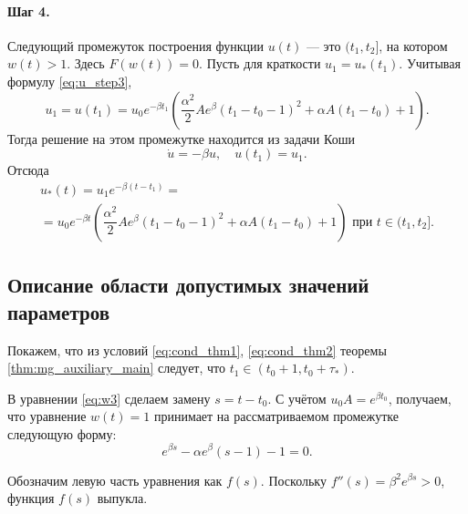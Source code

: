 \paragraph{Шаг 4.} Следующий промежуток построения функции $u(t)$ --- это $(t_1, t_2]$, на котором $w(t) > 1$. Здесь $F(w(t)) = 0$. Пусть для краткости $u_1 = u_*(t_1)$. Учитывая формулу \eqref{eq:u_step3},
\begin{equation*}
	u_1 = u(t_1) = u_0 e^{-\beta t_1}\left(\dfrac{\alpha^2}{2}Ae^{\beta}(t_1 - t_0 - 1)^2+\alpha A(t_1 - t_0)+1\right).
\end{equation*}
Тогда решение на этом промежутке находится из задачи Коши
\begin{equation*}
	\dot{u}=-\beta u,\quad u(t_1)=u_1.
\end{equation*}
Отсюда 
\begin{multline}
	\label{eq:u_step4}
	u_*(t)= u_1 e^{-\beta(t - t_1)} =\\= u_0 e^{-\beta t}\left(\dfrac{\alpha^2}{2}Ae^{\beta}(t_1 - t_0 - 1)^2 + \alpha A(t_1 - t_0) + 1\right) \text{ при } t \in (t_1,t_2].
\end{multline}

\subsection{Описание области допустимых значений параметров}

Покажем, что из условий \eqref{eq:cond_thm1}, \eqref{eq:cond_thm2} теоремы \ref{thm:mg_auxiliary_main} следует, что $t_1 \in (t_0+1,t_0+\tau_*)$.

В уравнении \eqref{eq:w3} сделаем замену $s = t - t_0$. С учётом $u_0A=e^{\beta t_0}$, получаем, что уравнение $w(t)=1$ принимает на рассматриваемом промежутке следующую форму:
\begin{equation}
	\label{eq:f}
	e^{\beta s} - \alpha e^{\beta}(s-1) - 1 = 0.
\end{equation}

Обозначим левую часть уравнения как $f(s)$. Поскольку $f''(s) = \beta^2 e^{\beta s} > 0$, функция $f(s)$ выпукла.

